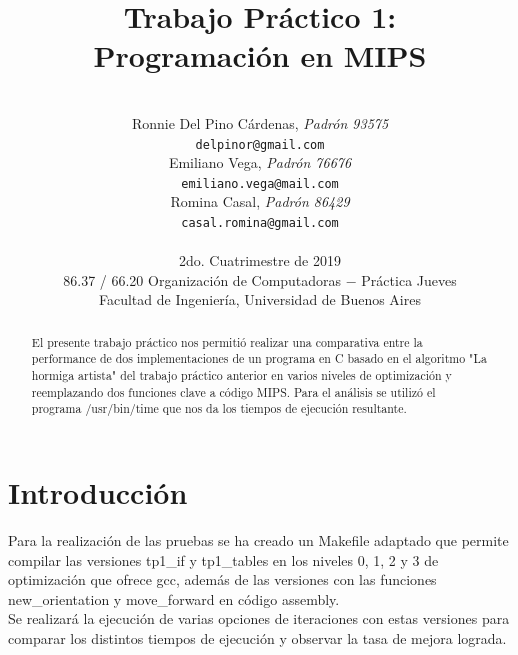 \documentclass[a4paper, 10pt, twoside, notitlepage]{article}
\title{\textbf{Trabajo Práctico 1:\\Programación en MIPS} \\}
\author{ \\
         Ronnie Del Pino Cárdenas, \textit{Padrón 93575} \\
          \texttt{ delpinor@gmail.com }       \\
		  [2.5ex]
         Emiliano Vega, \textit{Padrón 76676}     \\
          \texttt{emiliano.vega@mail.com}                      \\
		  [2.5ex]
	 Romina Casal, \textit{Padrón 86429} \\
          \texttt{casal.romina@gmail.com}                      \\
		  [2.5ex]
		 \\
         \normalsize{2do. Cuatrimestre de 2019}            \\
         \normalsize{86.37 / 66.20 Organización de Computadoras $-$ Práctica Jueves} \\
         \normalsize{Facultad de Ingeniería, Universidad de Buenos Aires}
       }
\date{}
\begin{document}
\maketitle

\begin{abstract}
El presente trabajo práctico nos permitió realizar una comparativa entre la performance de dos implementaciones de un programa en C basado en el algoritmo "La hormiga artista" del trabajo práctico anterior en varios niveles de optimización y reemplazando dos funciones clave a código MIPS. Para el análisis se utilizó el programa /usr/bin/time que nos da los tiempos de ejecución resultante.
\end{abstract}

%
%

\pagestyle{fancy}
\fancyhead{}
\fancyfoot{}
\renewcommand{\sectionmark}[1]{\markright{\thesection\ #1}}
\renewcommand{\headrulewidth}{0.4pt}
\fancyhead[LE]{\nouppercase \rightmark}
\fancyhead[RE, LO]{\bf \thepage}
\fancyhead[RO]{\nouppercase \rightmark}
\fancyfoot[C]{ }
\maketitle
\setcounter{page}{1}

\parskip 7.2pt
\section{Introducción}
Para la realización de las pruebas se ha creado un Makefile adaptado que permite compilar las versiones tp1\_if y tp1\_tables en los niveles 0, 1, 2 y 3 de optimización que ofrece gcc, además de las versiones con las funciones new\_orientation y move\_forward en código assembly.\\
Se realizará la ejecución de varias opciones de iteraciones con estas versiones para comparar los distintos tiempos de ejecución y observar la tasa de mejora lograda.\\

\end{document}

